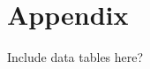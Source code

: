 \documentclass[preprint,authoryear,12pt]{elsarticle}
\begin{document}








\appendix

\section{Appendix}

Include data tables here?
\end{document}
